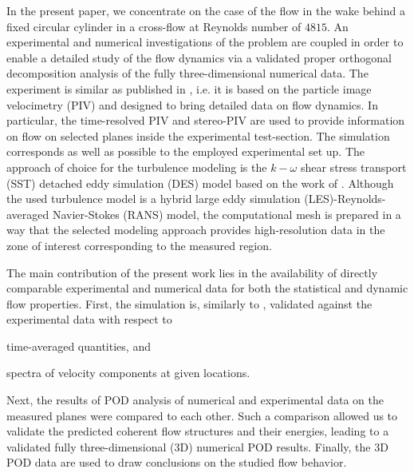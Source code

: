 In the present paper, we concentrate on the case of the flow in the wake behind a {fixed} circular cylinder in a cross-flow at Reynolds number of $4815$. An experimental and numerical investigations of the problem are coupled in order to enable a detailed study of the flow dynamics via a validated proper orthogonal decomposition analysis of the fully three-dimensional numerical data. The experiment is similar as published in \citep{uruba2020,uruba2020a}, i.e. it is based on the particle image velocimetry (PIV) and designed to bring detailed data on flow dynamics. In particular, the time-resolved PIV and stereo-PIV are used to provide information on flow on selected planes inside the experimental test-section. The simulation corresponds as well as possible to the employed experimental set up. The approach of choice for the turbulence modeling is the $k-\omega$ shear stress transport (SST) detached eddy simulation (DES) model based on the work {of} \citet{strelets2001}. Although the used turbulence model is a hybrid large eddy simulation (LES)-Reynolds-averaged Navier-Stokes (RANS) model, the computational mesh is prepared in a way that the selected modeling approach provides high-resolution data in the zone of interest corresponding to the measured region.

The main contribution of the present work lies in {the} availability of directly comparable experimental and numerical data for both the statistical and dynamic flow properties. First, the simulation is, similarly to \citep{jie2016,gonzalez2019}, validated against the experimental data with respect to
\begin{inparaenum}[(i)]
        \item time-averaged quantities, and
        \item spectra of velocity components at given locations.
\end{inparaenum}
Next, the results of POD analysis of numerical and experimental data on the measured planes were compared to each other. Such a comparison allowed us to validate the predicted coherent flow structures and their energies, leading to {a} validated fully three-dimensional (3D) numerical POD results. Finally, the 3D POD data are used to draw conclusions on the studied flow behavior.

